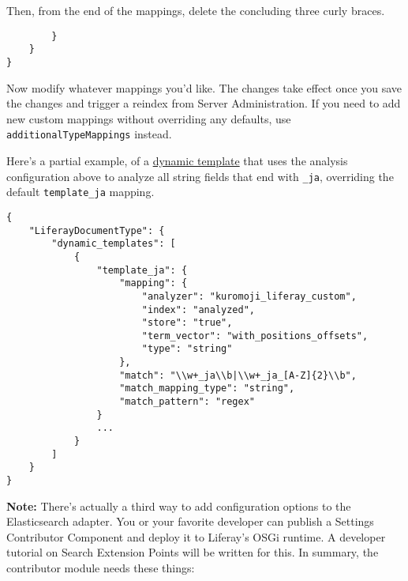 Then, from the end of the mappings, delete the concluding three curly
braces.

\begin{verbatim}
        }
    }
}
\end{verbatim}

Now modify whatever mappings you'd like. The changes take effect once
you save the changes and trigger a reindex from Server Administration.
If you need to add new custom mappings without overriding any defaults,
use \texttt{additionalTypeMappings} instead.

Here's a partial example, of a
\href{https://www.elastic.co/guide/en/elasticsearch/reference/2.4/dynamic-templates.html}{dynamic
template} that uses the analysis configuration above to analyze all
string fields that end with \texttt{\_ja}, overriding the default
\texttt{template\_ja} mapping.

\begin{verbatim}
{
    "LiferayDocumentType": {
        "dynamic_templates": [
            {
                "template_ja": {
                    "mapping": {
                        "analyzer": "kuromoji_liferay_custom",
                        "index": "analyzed",
                        "store": "true",
                        "term_vector": "with_positions_offsets",
                        "type": "string"
                    },
                    "match": "\\w+_ja\\b|\\w+_ja_[A-Z]{2}\\b",
                    "match_mapping_type": "string",
                    "match_pattern": "regex"
                }
                ...
            }
        ]
    }
}
\end{verbatim}

\noindent\hrulefill

\textbf{Note:} There's actually a third way to add configuration options
to the Elasticsearch adapter. You or your favorite developer can publish
a Settings Contributor Component and deploy it to Liferay's OSGi
runtime. A developer tutorial on Search Extension Points will be written
for this. In summary, the contributor module needs these things:

